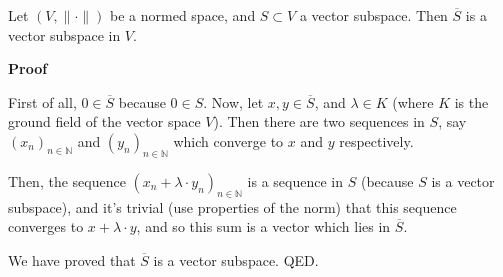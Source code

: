 \documentclass[12pt]{article}
\begin{document}
Let $(V, \| \cdot \|)$ be a normed space, and $S \subset V$ a vector subspace. Then $\overline{S}$ is a vector subspace in $V$.

\textbf{Proof}

First of all, $0 \in \overline{S}$ because $0 \in S$. Now, let $x, y \in \overline{S}$, and $\lambda \in K$ (where $K$ is the ground field of the vector space $V$). Then there are two sequences in $S$, say $(x_n)_{n \in \mathbb{N}}$ and $(y_n)_{n \in \mathbb{N}}$ which converge to $x$ and $y$ respectively.

Then, the sequence $(x_n + \lambda \cdot y_n)_{n \in \mathbb{N}}$ is a sequence in $S$ (because $S$ is a vector subspace), and it's trivial (use properties of the norm) that this sequence converges to $x + \lambda \cdot y$, and so this sum is a vector which lies in $\overline{S}$. 


We have proved that $\overline{S}$ is a vector subspace. QED.
\end{document}

